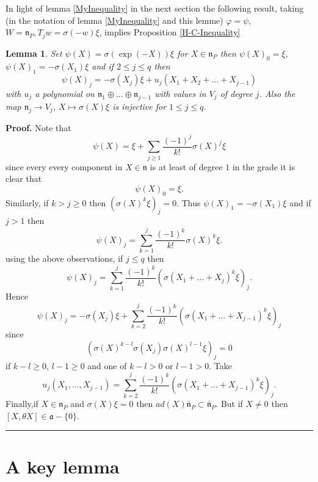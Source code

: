 \documentclass[12pt]{article}%
\newtheorem{lemma}[theorem]{Lemma}
\newenvironment{proof}[1][Proof]{\noindent\textbf{#1.} }{\ \rule{0.5em}{0.5em}}
\begin{document}
In light of lemma \ref{MyInequality} in the next section the following result,
taking (in the notation of lemma \ref{MyInequality} and this lemme)
$\varphi=\psi,$ $W=\mathfrak{n}_{P},T_{j}w=\sigma(-w)\xi$, implies Proposition
\ref{H-C-Inequality}

\begin{lemma}
\label{Setup}Set $\psi(X)=\sigma(\exp(-X))\xi$ for $X\in\mathfrak{n}_{P} $
then $\psi(X)_{0}=\xi$, $\psi(X)_{1}=-\sigma(X_{1})\xi$ and if $2\leq j\leq q$
then%
\[
\psi(X)_{j}=-\sigma(X_{j})\xi+u_{j}(X_{1}+X_{2}+...+X_{j-1})
\]
with $u_{j}$ a polynomial on $\mathfrak{n}_{1}\oplus...\oplus\mathfrak{n}%
_{j-1}$ with values in $V_{j}$ of degree $j$. Also the map $\mathfrak{n}%
_{j}\rightarrow V_{j}$, $X\mapsto\sigma(X)\xi$ is injective for $1\leq j\leq
q$.
\end{lemma}

\begin{proof}
Note that
\[
\psi(X)=\xi+\sum_{j\geq1}\frac{(-1)^{j}}{k!}\sigma(X)^{j}\xi
\]
since every every component in $X\in\mathfrak{n}$ is at least of degree $1$ in
the grade it is clear that%
\[
\psi(X)_{0}=\xi.
\]
Similarly, if $k>j\geq0$ then $\left(  \sigma(X)^{k}\xi\right)  _{j}=0$. Thus
$\psi(X)_{1}=-\sigma(X_{1})\xi$ and if $j>1$ then%
\[
\psi(X)_{j}=\sum_{k=1}^{j}\frac{(-1)^{k}}{k!}\sigma(X)^{k}\xi.
\]
using the above observations, if $j\leq q$ then
\[
\psi(X)_{j}=\sum_{k=1}^{j}\frac{(-1)^{k}}{k!}\left(  \sigma(X_{1}%
+...+X_{j})^{k}\xi\right)  _{j}.
\]
Hence%
\[
\psi(X)_{j}=-\sigma(X_{j})\xi+\sum_{k=2}^{j}\frac{(-1)^{k}}{k!}\left(
\sigma(X_{1}+...+X_{j-1})^{k}\xi\right)  _{j}
\]
since
\[
\left(  \sigma(X)^{k-l}\sigma(X_{j})\sigma(X)^{l-1}\xi\right)  _{j}=0
\]
if $k-l\geq0$, $l-1\geq0$ and one of $k-l>0$ or $l-1>0$. Take
\[
u_{j}(X_{1},...,X_{j-1})=\sum_{k=2}^{j}\frac{(-1)^{k}}{k!}\left(  \sigma
(X_{1}+...+X_{j-1})^{k}\xi\right)  _{j}\text{.}
\]
Finally,if $X\in\mathfrak{n}_{P}$ and $\sigma(X)\xi=0$ then
$ad(X)\mathfrak{\bar{n}}_{P}\mathfrak{\subset\mathfrak{\bar{n}}}_{P}$. But if
$X\neq0$ then $[X,\theta X]\in\mathfrak{a}-\{0\}$.
\end{proof}

\section{A key lemma\label{key}}
\end{document}
